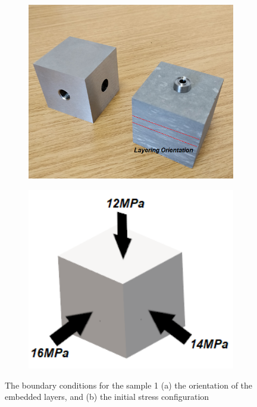 \begin{figure}[!ht]
\begin{subfigure}[c]{0.48\textwidth}
\includegraphics[width=1\textwidth]{figures/Amir_Percolation_Orientation1.png}
\subcaption{}
\label{fig:Amir_Percolation_Orientation1}
\end{subfigure}
\hfill
\begin{subfigure}[c]{0.48\textwidth}
\includegraphics[width=1\textwidth]{figures/Amir_Percolation_Stress_1.png}
\subcaption{}
\label{fig:Amir_Percolation_Stress_1}
\end{subfigure}
\caption{The boundary conditions for the sample 1 (a) the orientation of the embedded layers, and (b) the initial stress configuration}
\end{figure}


